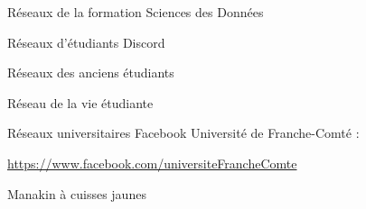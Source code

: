 \documentclass [xcolor=x11names,t] {beamer}
\begin{document}
\begin{frame}{Réseaux de la formation  Sciences des Données} %
\begin{block}{Réseaux d'étudiants}
    Discord
    
    Réseaux des anciens étudiants
    
    Réseau de la vie étudiante
    
\end{block}
\begin{block}{Réseaux universitaires}
   Facebook Université de Franche-Comté :
   
   \small \textcolor{myuniversity}{\url{https://www.facebook.com/universiteFrancheComte}}
\end{block}
Manakin à cuisses jaunes
\end{frame}
\end{document}
